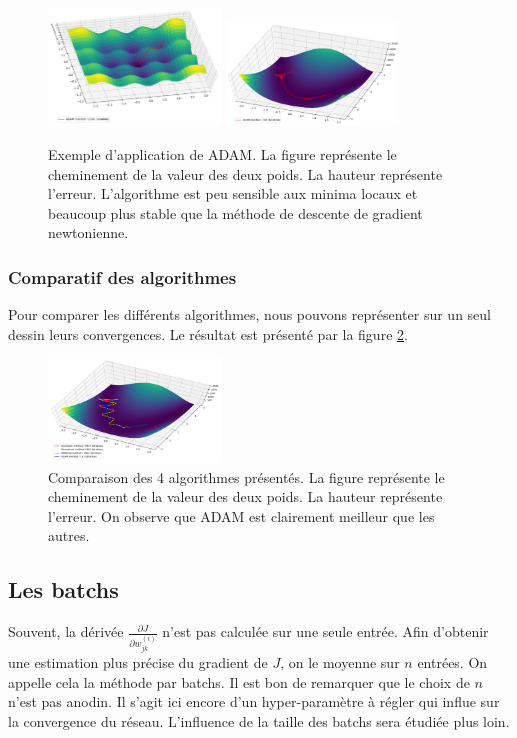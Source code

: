 \begin{figure}[!h]
\centering
\includegraphics[width=130pt]{"images/MLP/adam"}
\hspace*{10mm}
\includegraphics[width=130pt]{"images/MLP/adampropre"}
\caption{Exemple d'application de ADAM. La figure représente le cheminement de la valeur des deux poids. La hauteur représente l'erreur. L'algorithme est peu sensible aux minima locaux et beaucoup plus stable que la méthode de descente de gradient newtonienne.}
\label{ADAM}
\end{figure}



\subsubsection{Comparatif des algorithmes}

Pour comparer les différents algorithmes, nous pouvons représenter sur un seul dessin leurs convergences. Le résultat est présenté par la figure \ref{Comparatifoptimiseurs}.

\begin{figure}[!h]
\centering
\includegraphics[width=130pt]{"images/MLP/comparatifoptimiseurs"}
\caption{Comparaison des 4 algorithmes présentés. La figure représente le cheminement de la valeur des deux poids. La hauteur représente l'erreur. On observe que ADAM est clairement meilleur que les autres.}
\label{Comparatifoptimiseurs}
\end{figure}

\subsection{Les batchs}
Souvent, la dérivée $\frac{\partial J}{\partial w_{jk}^{(i)}}$ n'est pas calculée sur une seule entrée. Afin d'obtenir une estimation plus précise du gradient de $J$, on le moyenne sur $n$ entrées. On appelle cela la méthode par batchs. Il est bon de remarquer que le choix de $n$ n'est pas anodin. Il s'agit ici encore d'un hyper-paramètre à régler qui influe sur la convergence du réseau. L'influence de la taille des batchs sera étudiée plus loin.




